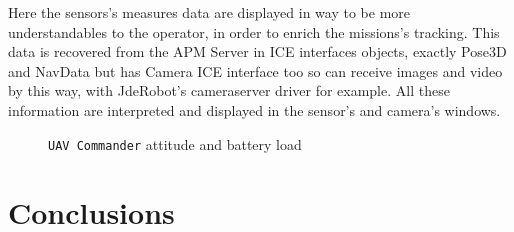 \documentclass{llncs}
\begin{document}
Here the sensors's measures data are displayed in way to be more understandables to the operator, in order to enrich the missions's tracking. This data is recovered from the APM Server in ICE interfaces objects, exactly Pose3D and NavData but has Camera ICE interface too so can receive images and video by this way, with JdeRobot's cameraserver driver for example. All these information are interpreted and displayed in the sensor's and camera's windows.

\begin{figure}
    \caption{\texttt{UAV Commander} attitude and battery load}
  
\end{figure}

\section{Conclusions}
\end{document}

